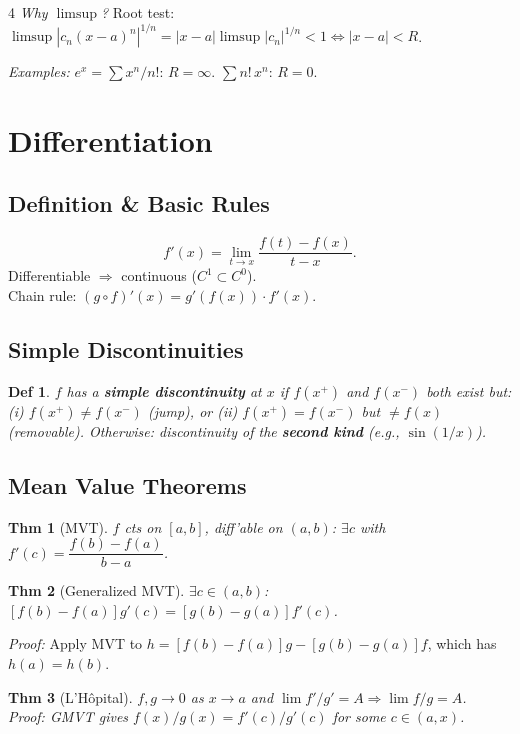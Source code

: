 \documentclass[9pt,landscape]{extarticle}
\theoremstyle{compact}
\newtheorem*{thm}{Thm}
\newtheorem*{defn}{Def}
\begin{document}
\begin{multicols}{4}
\textit{Why $\limsup$?} Root test: $\limsup|c_n(x-a)^n|^{1/n} = |x-a|\limsup|c_n|^{1/n} < 1 \Leftrightarrow |x-a| < R$.

\textit{Examples:} $e^x = \sum x^n/n!$: $R = \infty$. $\sum n!\, x^n$: $R = 0$.

\section{Differentiation}

\subsection{Definition \& Basic Rules}
$$f'(x) = \lim_{t\to x}\frac{f(t)-f(x)}{t-x}.$$
Differentiable $\Rightarrow$ continuous ($C^1 \subset C^0$). \\
Chain rule: $(g\circ f)'(x) = g'(f(x))\cdot f'(x)$.

\subsection{Simple Discontinuities}
\begin{defn}
$f$ has a \textbf{simple discontinuity} at $x$ if $f(x^+)$ and $f(x^-)$ both exist but: (i) $f(x^+)\neq f(x^-)$ (jump), or (ii) $f(x^+)=f(x^-)$ but $\neq f(x)$ (removable). Otherwise: discontinuity of the \textbf{second kind} (e.g., $\sin(1/x)$).
\end{defn}

\subsection{Mean Value Theorems}
\begin{thm}[MVT]
$f$ cts on $[a,b]$, diff'able on $(a,b)$: $\exists c$ with $f'(c) = \dfrac{f(b)-f(a)}{b-a}$.
\end{thm}

\begin{thm}[Generalized MVT]
$\exists c \in (a,b)$: $[f(b)-f(a)]g'(c) = [g(b)-g(a)]f'(c)$.
\end{thm}
\textit{Proof:} Apply MVT to $h = [f(b)-f(a)]g - [g(b)-g(a)]f$, which has $h(a)=h(b)$.

\begin{thm}[L'H\^opital]
$f,g \to 0$ as $x\to a$ and $\lim f'/g' = A \Rightarrow \lim f/g = A$. \\
\textit{Proof:} GMVT gives $f(x)/g(x) = f'(c)/g'(c)$ for some $c\in(a,x)$.
\end{thm}


\end{multicols}
\end{document}
